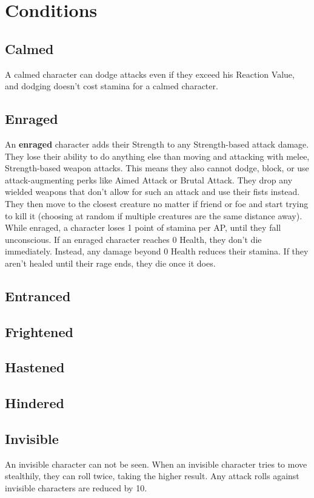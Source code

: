\chapter{Conditions}

\section{Calmed}
A calmed character can dodge attacks even if they exceed his Reaction Value, and dodging doesn't cost stamina for a calmed character.

\section{Enraged}
An \textbf{enraged} character adds their Strength to any Strength-based attack damage. They lose their ability to do anything else than moving and attacking with melee, Strength-based weapon attacks. This means they also cannot dodge, block, or use attack-augmenting perks like Aimed Attack or Brutal Attack. They drop any wielded weapons that don't allow for such an attack and use their fists instead. They then move to the closest creature no matter if friend or foe and start trying to kill it (choosing at random if multiple creatures are the same distance away). While enraged, a character loses 1 point of stamina per AP, until they fall unconscious. If an enraged character reaches 0 Health, they don't die immediately. Instead, any damage beyond 0 Health reduces their stamina. If they aren't healed until their rage ends, they die once it does.

\section{Entranced}

\section{Frightened}

\section{Hastened}

\section{Hindered}

\section{Invisible}
An invisible character can not be seen. When an invisible character tries to move stealthily, they can roll twice, taking the higher result. Any attack rolls against invisible characters are reduced by 10.

